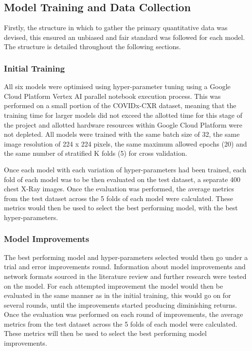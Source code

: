 \subsection{Model Training and Data Collection} \label{model-training}
Firstly, the structure in which to gather the primary quantitative data was devised, this ensured an unbiased and fair standard was followed for each model. The structure is detailed throughout the following sections.


\subsubsection{Initial Training}
All six models were optimised using hyper-parameter tuning using a Google Cloud Platform Vertex AI parallel notebook execution process. This was performed on a small portion of the COVIDx-CXR dataset, meaning that the training time for larger models did not exceed the allotted time for this stage of the project and allotted hardware resources within Google Cloud Platform were not depleted. All models were trained with the same batch size of 32, the same image resolution of 224 x 224 pixels, the same maximum allowed epochs (20) and the same number of stratified K folds (5) for cross validation.

Once each model with each variation of hyper-parameters had been trained, each fold of each model was to be then evaluated on the test dataset, a separate 400 chest X-Ray images. Once the evaluation was performed, the average metrics from the test dataset across the 5 folds of each model were calculated. These metrics would then be used to select the best performing model, with the best hyper-parameters.

\subsubsection{Model Improvements}
The best performing model and hyper-parameters selected would then go under a trial and error improvements round. Information about model improvements and network formats sourced in the literature review and further research were tested on the model. For each attempted improvement the model would then be evaluated in the same manner as in the initial training, this would go on for several rounds, until the improvements started producing diminishing returns. Once the evaluation was performed on each round of improvements, the average metrics from the test dataset across the 5 folds of each model were calculated. These metrics will then be used to select the best performing model improvements.

